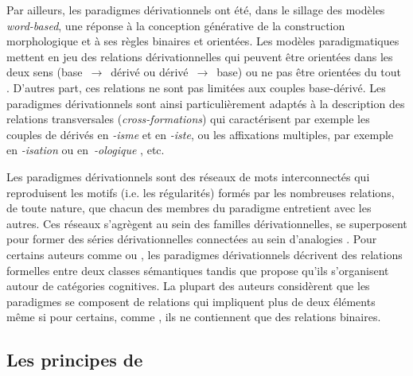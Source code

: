 \documentclass[output=paper]{langsci/langscibook}
\begin{document}
Par ailleurs, les paradigmes dérivationnels ont  été,  dans le sillage des modèles \emph{word-based}, une réponse à la conception générative de la construction morphologique et à ses règles binaires et orientées.  Les modèles paradigmatiques mettent en jeu des relations dérivationnelles qui peuvent être orientées dans les deux sens
(base~$\rightarrow$~dérivé ou dérivé~$\rightarrow$~base) ou ne pas être orientées du tout \citep{Jackendoff75}.  D'autres part, ces relations ne sont  pas limitées aux couples base-dérivé.  Les paradigmes dérivationnels sont ainsi particulièrement adaptés à la description des relations transversales (\emph{cross-formations}) qui caractérisent par exemple les couples de dérivés en \emph{\mbox{-isme}} et en \emph{\mbox{-iste}}, ou  les affixations multiples, par exemple en \emph{\mbox{-isation}} ou en\emph{\mbox{ -ologique}} \citep{lasserre2014.cmlf}, etc.

Les paradigmes dérivationnels sont des réseaux de mots interconnectés qui reproduisent les motifs (i.e. les régularités) formés par les nombreuses relations, de toute nature, que chacun des membres du paradigme entretient avec les autres.  Ces réseaux s'agrègent au sein des familles dérivationnelles, se superposent pour former des séries dérivationnelles connectées au sein d'analogies \citep{skousen1989.analogical-modeling,skousen1992.analogy-and-structure,krott2001.analogy,Dal2003a,blevins2009.OUP,arndt-lappe2015.analogy}.  Pour certains auteurs comme \citet{stump1991.language} ou \citet{spencer2013.lexical-relatedness},   les paradigmes dérivationnels décrivent des relations formelles entre deux classes sémantiques tandis que \citet{stekauer2014.derivational-paradigms} propose qu'ils s'organisent autour de catégories cognitives.  La plupart des auteurs considèrent que les paradigmes se composent de relations qui impliquent plus de deux éléments \citep{vanMarle85,Booij10} même si pour certains, comme \citet{spencer2013.lexical-relatedness}, ils ne contiennent que des relations binaires.

\subsection{Les principes de \paradis{}}
\label{sec:principes-paradis}
\end{document}
